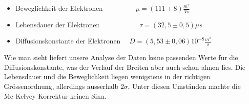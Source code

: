 \documentclass[12pt]{article}
\begin{document}
\begin{itemize}
\begin{itemize}
\begin{itemize}
 \item Beweglichkeit der Elektronen ~~~~~~~~~$\mu = (111 \pm 8) \frac{m^2}{Vs}$ 
 \item Lebensdauer der Elektronen ~~~~~~~~~~~$\tau = (32,5 \pm 0,5) \mu s $
 \item Diffusionskonstante der Elektronen ~~$D = (5,53 \pm 0,06) 10^{-8} \frac{m^2}{s}$
\end{itemize}
\end{itemize}
Wie man sieht liefert unsere Analyse der Daten keine passenden Werte für die Diffusionskonstante, was der Verlauf der Breiten aber auch schon ahnen lies. Die Lebensdauer und die Beweglichkeit liegen wenigstens in der richtigen Grössenordnung, allerdings ausserhalb $2\sigma$. Unter diesen Umständen machte die Mc Kelvey Korrektur keinen Sinn.
\end{itemize}
\end{document}
